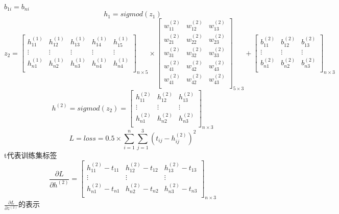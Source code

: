 \documentclass{article}
\begin{document}
	$b_{1i}=b_{ni}$
	$$
	h_1=sigmod(z_1)
	$$
	$$
	z_{2}=\left[                 
	\begin{array}{ccccc}  
	h^{(1)}_{11} & h^{(1)}_{12} & h^{(1)}_{13} & h^{(1)}_{14} & h^{(1)}_{15}\\  
	\vdots & \vdots & \vdots & \vdots & \vdots\\ 
	h^{(1)}_{n1} & h^{(1)}_{n2} & h^{(1)}_{n3} & h^{(1)}_{n4} & h^{(1)}_{n4}\\ 
	\end{array}
	\right]_{n\times5} \times \left[                 
	\begin{array}{ccc}  
	w^{(2)}_{11} & w^{(2)}_{12} & w^{(2)}_{13} \\  
	w^{(2)}_{21} & w^{(2)}_{22} & w^{(2)}_{23} \\  
	w^{(2)}_{31} & w^{(2)}_{32} & w^{(2)}_{33} \\ 
	w^{(2)}_{41} & w^{(2)}_{42} & w^{(2)}_{43} \\ 
	w^{(2)}_{41} & w^{(2)}_{42} & w^{(2)}_{43} \\ 
	\end{array}
	\right]_{5\times3}+\left[                 
	\begin{array}{ccccc}  
	b^{(2)}_{11} & b^{(2)}_{12} & b^{(2)}_{13} \\  
	\vdots & \vdots & \vdots \\ 
	b^{(2)}_{n1} & b^{(2)}_{n2} & b^{(2)}_{n3} \\ 
	\end{array}
	\right]_{n\times3}
	$$
	$$
	h^{(2)}=sigmod(z_2)=\left[                 
	\begin{array}{ccc}  
	h^{(2)}_{11} & h^{(2)}_{12} & h^{(2)}_{13} \\  
	\vdots & \vdots & \vdots \\ 
	h^{(2)}_{n1} & h^{(2)}_{n2} & h^{(2)}_{n3} \\ 
	\end{array}
	\right]_{n\times3}
	$$
	$$
	L=loss=0.5\times\sum_{i=1}^n\sum_{j=1}^3(t_{ij}-h^{(2)}_{ij})^2
	$$
	t代表训练集标签
	$$
	\frac{\partial L}{\partial h^{(2)}}=\left[                 
	\begin{array}{ccc}  
	h^{(2)}_{11}-t_{11} & h^{(2)}_{12}-t_{12} & h^{(2)}_{13}-t_{13} \\  
	\vdots & \vdots & \vdots \\ 
	h^{(2)}_{n1}-t_{n1} & h^{(2)}_{n2}-t_{n2} & h^{(2)}_{n3}-t_{n3} \\  
	\end{array}
	\right]_{n\times3}
	$$
	$\frac{\partial L}{\partial z^{(2)}}$的表示
\end{document}
